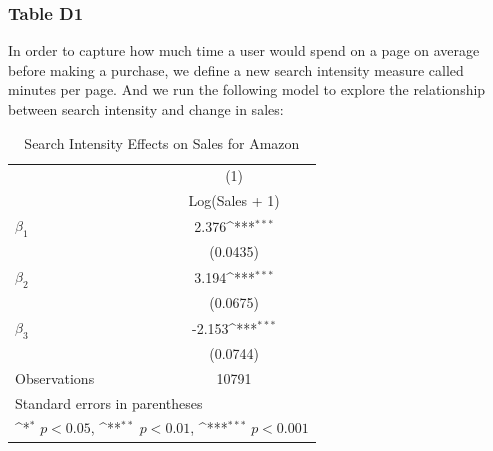 \documentclass{article}
\begin{document}
\subsubsection{Table D1}
In order to capture how much time a user would spend on a page on average before making a purchase, we define a new search intensity measure called minutes per page. And we run the following model to explore the relationship between search intensity and change in sales:\\
\begin{table}[!h]\centering
	\def\sym#1{\ifmmode^{#1}\else\(^{#1}\)\fi}
	\caption{Search Intensity Effects on Sales for Amazon}
	\label{tab:tabD1}
	\begin{tabular}{l*{1}{c}}
		\\[-1.8ex]\hline 
		\hline
		&\multicolumn{1}{c}{(1)}\\
		&\multicolumn{1}{c}{Log(Sales + 1)}\\
		\midrule
		$\beta_1$         &       2.376\sym{***}\\
		&    (0.0435)         \\
		\addlinespace
		$\beta_2$      &       3.194\sym{***}\\
		&    (0.0675)         \\
		\addlinespace
		$\beta_3$            &      -2.153\sym{***}\\
		&    (0.0744)         \\
		\midrule
		Observations        &       10791         \\
		\bottomrule
		\multicolumn{2}{l}{\footnotesize Standard errors in parentheses}\\
		\multicolumn{2}{l}{\footnotesize \sym{*} \(p<0.05\), \sym{**} \(p<0.01\), \sym{***} \(p<0.001\)}\\ 
	\end{tabular}
\end{table}
\end{document}
